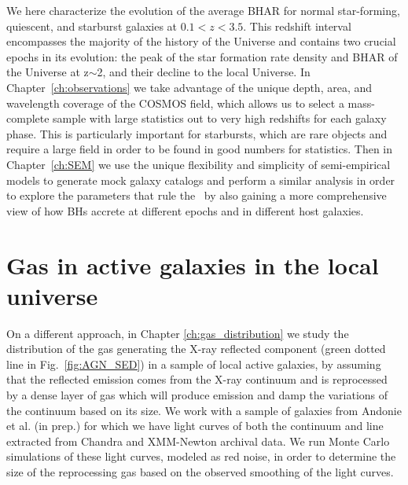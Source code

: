         We here characterize the evolution of the average BHAR for normal star-forming, quiescent, and starburst galaxies at $0.1<z<3.5$. This redshift interval encompasses the majority of the history of the Universe and contains two crucial epochs in its evolution: the peak of the star formation rate density and BHAR of the Universe at z$\sim$2, and their decline to the local Universe. In Chapter~\ref{ch:observations} 
        we take advantage of the unique depth, area, and wavelength coverage of the COSMOS field, which allows us to select a mass-complete sample with large statistics out to very high redshifts for each galaxy phase. This is particularly important for starbursts, which are rare objects and require a large field in order to be found in good numbers for statistics.
        Then in Chapter~\ref{ch:SEM} we use the unique flexibility and simplicity of semi-empirical models to generate mock galaxy catalogs and perform a similar analysis in order to explore the parameters that rule the \LXMS\ by also
        gaining a more comprehensive view of how BHs accrete at different epochs and in different host galaxies.
        
        
        \section{Gas in active galaxies in the local universe}
        On a different approach, in Chapter \ref{ch:gas_distribution} we study the distribution of the gas generating the X-ray reflected component (green dotted line in Fig.~\ref{fig:AGN_SED}) in a sample of local active galaxies, by assuming that the reflected emission comes from the X-ray continuum and is reprocessed by a dense layer of gas which will produce \kalfa{} emission and damp the variations of the continuum based on its size. We work with a sample of galaxies from Andonie et al. (in prep.) for which we have light curves of both the continuum and \kalfa{} line extracted from Chandra and XMM-Newton archival data. We run Monte Carlo simulations of these light curves, modeled as red noise, in order to determine the size of the reprocessing gas based on the observed smoothing of the \kalfa{} light curves.
